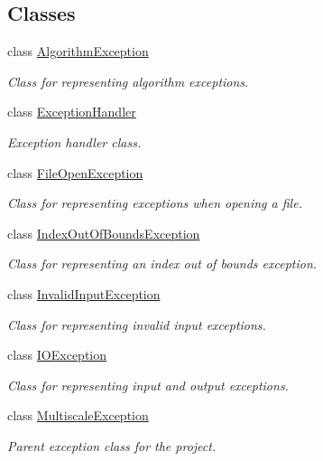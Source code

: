 \subsection*{Classes}
\begin{DoxyCompactItemize}
\item 
class \hyperlink{classmultiscale_1_1AlgorithmException}{Algorithm\-Exception}
\begin{DoxyCompactList}\small\item\em Class for representing algorithm exceptions. \end{DoxyCompactList}\item 
class \hyperlink{classmultiscale_1_1ExceptionHandler}{Exception\-Handler}
\begin{DoxyCompactList}\small\item\em Exception handler class. \end{DoxyCompactList}\item 
class \hyperlink{classmultiscale_1_1FileOpenException}{File\-Open\-Exception}
\begin{DoxyCompactList}\small\item\em Class for representing exceptions when opening a file. \end{DoxyCompactList}\item 
class \hyperlink{classmultiscale_1_1IndexOutOfBoundsException}{Index\-Out\-Of\-Bounds\-Exception}
\begin{DoxyCompactList}\small\item\em Class for representing an index out of bounds exception. \end{DoxyCompactList}\item 
class \hyperlink{classmultiscale_1_1InvalidInputException}{Invalid\-Input\-Exception}
\begin{DoxyCompactList}\small\item\em Class for representing invalid input exceptions. \end{DoxyCompactList}\item 
class \hyperlink{classmultiscale_1_1IOException}{I\-O\-Exception}
\begin{DoxyCompactList}\small\item\em Class for representing input and output exceptions. \end{DoxyCompactList}\item 
class \hyperlink{classmultiscale_1_1MultiscaleException}{Multiscale\-Exception}
\begin{DoxyCompactList}\small\item\em Parent exception class for the project. \end{DoxyCompactList}\item 

\end{DoxyCompactItemize}
